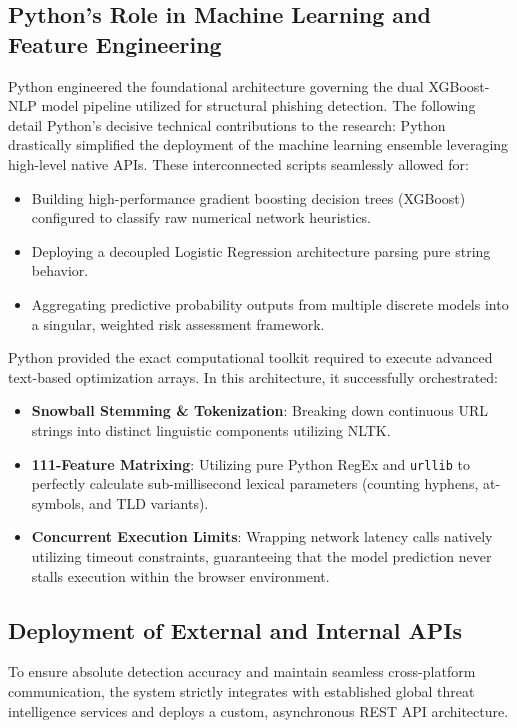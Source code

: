 \subsection{Python's Role in Machine Learning and Feature Engineering}
\noindent
Python engineered the foundational architecture governing the dual XGBoost-NLP model pipeline utilized for structural phishing detection. The following detail Python's decisive technical contributions to the research:
\noindent
\noindent
{}
\noindent
Python drastically simplified the deployment of the machine learning ensemble leveraging high-level native APIs. These interconnected scripts seamlessly allowed for:

\begin{itemize}
\item Building high-performance gradient boosting decision trees (XGBoost) configured to classify raw numerical network heuristics.
\item Deploying a decoupled Logistic Regression architecture parsing pure string behavior.
\item Aggregating predictive probability outputs from multiple discrete models into a singular, weighted risk assessment framework.
\end{itemize}


\noindent
Python provided the exact computational toolkit required to execute advanced text-based optimization arrays. In this architecture, it successfully orchestrated:

\begin{itemize}
\item \textbf{Snowball Stemming \& Tokenization}: Breaking down continuous URL strings into distinct linguistic components utilizing NLTK.
\item \textbf{111-Feature Matrixing}: Utilizing pure Python RegEx and \texttt{urllib} to perfectly calculate sub-millisecond lexical parameters (counting hyphens, at-symbols, and TLD variants).
\item \textbf{Concurrent Execution Limits}: Wrapping network latency calls natively utilizing timeout constraints, guaranteeing that the model prediction never stalls execution within the browser environment.
\end{itemize}

\subsection{Deployment of External and Internal APIs}
\noindent
To ensure absolute detection accuracy and maintain seamless cross-platform communication, the system strictly integrates with established global threat intelligence services and deploys a custom, asynchronous REST API architecture.

